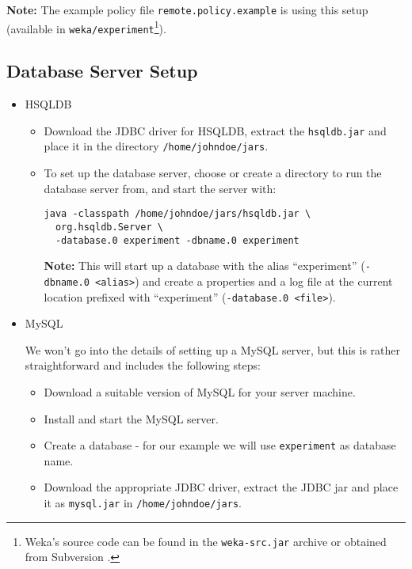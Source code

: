 \noindent \textbf{Note:} The example policy file \texttt{remote.policy.example} is using this setup (available in \texttt{weka/experiment}\footnote{Weka's source code can be found in the \texttt{weka-src.jar} archive or obtained from Subversion \cite{subversion}.}).

\subsection{Database Server Setup}

\begin{itemize}
	\item HSQLDB
	
		\begin{itemize}
			\item Download the JDBC driver for HSQLDB, extract the \texttt{hsqldb.jar} and place it in the directory \texttt{/home/johndoe/jars}.
			
			\item To set up the database server, choose or create a directory to run the database server from, and start the server with:

				\begin{verbatim}
java -classpath /home/johndoe/jars/hsqldb.jar \
  org.hsqldb.Server \
  -database.0 experiment -dbname.0 experiment
				\end{verbatim}
				
				\textbf{Note:} This will start up a database with the alias ``experiment'' (\texttt{-dbname.0 <alias>}) and create a properties and a log file at the current location prefixed with ``experiment'' (\texttt{-database.0 <file>}).
				
		\end{itemize}
		
	\item MySQL
	
We won't go into the details of setting up a MySQL server, but this is rather straightforward and includes the following steps:

		\begin{itemize}
  			\item Download a suitable version of MySQL for your server machine.
  			\item Install and start the MySQL server.
  			\item Create a database - for our example we will use \texttt{experiment} as database name.
  			\item Download the appropriate JDBC driver, extract the JDBC jar and place it as \texttt{mysql.jar} in \texttt{/home/johndoe/jars}.
		\end{itemize}
		
\end{itemize}

